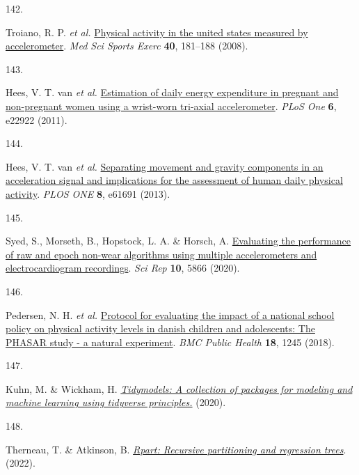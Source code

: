 \documentclass[
  10pt,
]{scrbook}
\newlength{\cslhangindent}
\newlength{\csllabelwidth}
\newlength{\cslentryspacingunit} %
\newenvironment{CSLReferences}[2] %
 {%
  \setlength{\parindent}{0pt}
  \ifodd #1
  \let\oldpar\par
  \def\par{\hangindent=\cslhangindent\oldpar}
  \fi
  \setlength{\parskip}{#2\cslentryspacingunit}
 }%
 {}
\newcommand{\CSLLeftMargin}[1]{\parbox[t]{\csllabelwidth}{#1}}
\newcommand{\CSLRightInline}[1]{\parbox[t]{\linewidth - \csllabelwidth}{#1}\break}
\let\originaltextbf\textbf
\renewcommand{\textbf}[1]{\textcolor{color1}{\textsf{\originaltextbf{#1}}}}
\begin{document}
\begin{CSLReferences}{0}{0}
\leavevmode{}%
\CSLLeftMargin{142. }%
\CSLRightInline{Troiano, R. P. \emph{et al.}
\href{https://doi.org/10.1249/mss.0b013e31815a51b3}{Physical activity in
the united states measured by accelerometer}. \emph{Med Sci Sports
Exerc} \textbf{40}, 181--188 (2008).}

\leavevmode{}%
\CSLLeftMargin{143. }%
\CSLRightInline{Hees, V. T. van \emph{et al.}
\href{https://doi.org/10.1371/journal.pone.0022922}{Estimation of daily
energy expenditure in pregnant and non-pregnant women using a wrist-worn
tri-axial accelerometer}. \emph{{PLoS} One} \textbf{6}, e22922 (2011).}

\leavevmode{}%
\CSLLeftMargin{144. }%
\CSLRightInline{Hees, V. T. van \emph{et al.}
\href{https://doi.org/10.1371/journal.pone.0061691}{Separating movement
and gravity components in an acceleration signal and implications for
the assessment of human daily physical activity}. \emph{{PLOS} {ONE}}
\textbf{8}, e61691 (2013).}

\leavevmode{}%
\CSLLeftMargin{145. }%
\CSLRightInline{Syed, S., Morseth, B., Hopstock, L. A. \& Horsch, A.
\href{https://doi.org/10.1038/s41598-020-62821-2}{Evaluating the
performance of raw and epoch non-wear algorithms using multiple
accelerometers and electrocardiogram recordings}. \emph{Sci Rep}
\textbf{10}, 5866 (2020).}

\leavevmode{}%
\CSLLeftMargin{146. }%
\CSLRightInline{Pedersen, N. H. \emph{et al.}
\href{https://doi.org/10.1186/s12889-018-6144-8}{Protocol for evaluating
the impact of a national school policy on physical activity levels in
danish children and adolescents: The PHASAR study - a natural
experiment}. \emph{BMC Public Health} \textbf{18}, 1245 (2018).}

\leavevmode{}%
\CSLLeftMargin{147. }%
\CSLRightInline{Kuhn, M. \& Wickham, H.
\emph{\href{https://www.tidymodels.org}{Tidymodels: A collection of
packages for modeling and machine learning using tidyverse principles.}}
(2020).}

\leavevmode{}%
\CSLLeftMargin{148. }%
\CSLRightInline{Therneau, T. \& Atkinson, B.
\emph{\href{https://CRAN.R-project.org/package=rpart}{Rpart: Recursive
partitioning and regression trees}}. (2022).}


\end{CSLReferences}
\end{document}
